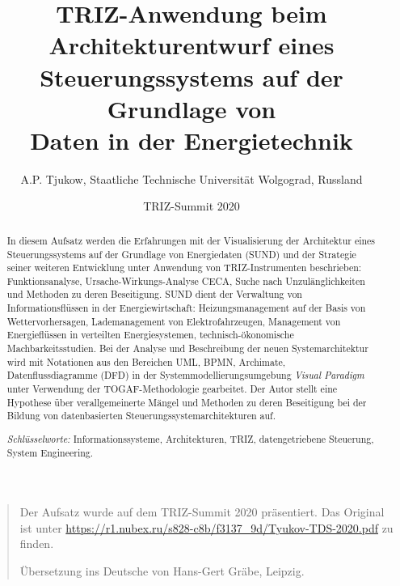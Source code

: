 \documentclass[11pt,a4paper]{article}
\title{TRIZ-Anwendung beim Architekturentwurf eines\\ Steuerungssystems auf
  der Grundlage von\\ Daten in der Energietechnik}
\author{A.P. Tjukow, Staatliche Technische Universität Wolgograd, Russland}
\date{TRIZ-Summit 2020}
\begin{document}
\maketitle

\begin{quote}
  Der Aufsatz wurde auf dem TRIZ-Summit 2020 präsentiert. Das Original ist
  unter
  \url{https://r1.nubex.ru/s828-c8b/f3137_9d/Tyukov-TDS-2020.pdf}
  zu finden.

  Übersetzung ins Deutsche von Hans-Gert Gräbe, Leipzig.
\end{quote}

\begin{abstract}
  In diesem Aufsatz werden die Erfahrungen mit der Visualisierung der
  Architektur eines Steuerungssystems auf der Grundlage von Energiedaten
  (SUND) und der Strategie seiner weiteren Entwicklung unter Anwendung von
  TRIZ-Instrumenten beschrieben: Funktionsanalyse, Ursache-Wirkungs-Analyse
  CECA, Suche nach Unzulänglichkeiten und Methoden zu deren Beseitigung.  SUND
  dient der Verwaltung von Informationsflüssen in der Energiewirtschaft:
  Heizungsmanagement auf der Basis von Wettervorhersagen, Lademanagement von
  Elektrofahrzeugen, Management von Energieflüssen in verteilten
  Energiesystemen, technisch-ökonomische Machbarkeitsstudien. Bei der Analyse
  und Beschreibung der neuen Systemarchitektur wird mit Notationen aus den
  Bereichen UML, BPMN, Archimate, Datenflussdiagramme (DFD) in der
  Systemmodellierungsumgebung \emph{Visual Paradigm} unter Verwendung der
  TOGAF-Methodologie gearbeitet.  Der Autor stellt eine Hypothese über
  verallgemeinerte Mängel und Methoden zu deren Beseitigung bei der Bildung
  von datenbasierten Steuerungssystemarchitekturen auf.

  \emph{Schlüsselworte:} Informationssysteme, Architekturen, TRIZ,
  datengetriebene Steuerung, System Engineering.
\end{abstract}
\end{document}
